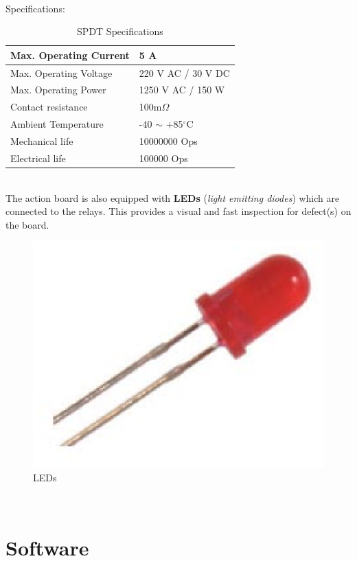 \documentclass[12pt,a4paper,draft]{report}
\begin{document}
\ \\
Specifications:
\begin{table}[H]
\centering
    \begin{tabular}{|l|l|}
    \hline Max. Operating Current & 5 A \\
    \hline Max. Operating Voltage & 220 V AC / 30 V DC \\
    \hline Max. Operating Power & 1250 V AC / 150 W \\
    \hline Contact resistance & 100m$\Omega$ \\
    \hline Ambient Temperature & -40 $\sim$ +85$^\circ$C \\
    \hline Mechanical life & 10000000 Ops \\
    \hline Electrical life & 100000 Ops \\
    \hline
    \end{tabular}
    \caption{SPDT Specifications}
\end{table}
\ \\
The action board is also equipped with \textbf{LEDs} (\textit{light emitting diodes}) which are connected to the relays. This provides a visual and fast inspection for defect(s) on the board.
\begin{figure}[H]
\centering
    \includegraphics*[scale=0.2]{led}
    \caption{LEDs}
\end{figure}
\ \\
%
\section{Software}
\end{document}
